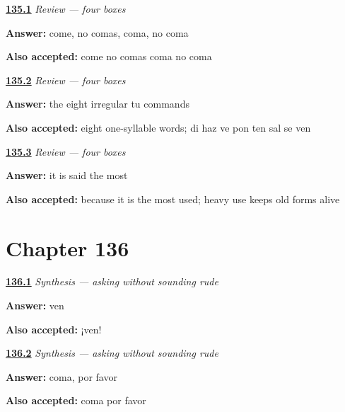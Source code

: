 \noindent\begin{minipage}[t]{\linewidth}
\raggedright
\hyperlink{review-ES-C50-repaso-mandatos-grid}{\textbf{135.1}} \emph{Review — four boxes}\par
\small \textbf{Answer:} come, no comas, coma, no coma\par
\footnotesize \textbf{Also accepted:} come no comas coma no coma
\end{minipage}\par\medskip

\noindent\begin{minipage}[t]{\linewidth}
\raggedright
\hyperlink{review-ES-C50-repaso-mandatos-cost}{\textbf{135.2}} \emph{Review — four boxes}\par
\small \textbf{Answer:} the eight irregular tu commands\par
\footnotesize \textbf{Also accepted:} eight one-syllable words; di haz ve pon ten sal se ven
\end{minipage}\par\medskip

\noindent\begin{minipage}[t]{\linewidth}
\raggedright
\hyperlink{review-ES-C50-repaso-mandatos-odd}{\textbf{135.3}} \emph{Review — four boxes}\par
\small \textbf{Answer:} it is said the most\par
\footnotesize \textbf{Also accepted:} because it is the most used; heavy use keeps old forms alive
\end{minipage}\par\medskip

\section*{Chapter 136}

\noindent\begin{minipage}[t]{\linewidth}
\raggedright
\hyperlink{review-ES-C50-sintesis-pedir-bien-friend}{\textbf{136.1}} \emph{Synthesis — asking without sounding rude}\par
\small \textbf{Answer:} ven\par
\footnotesize \textbf{Also accepted:} ¡ven!
\end{minipage}\par\medskip

\noindent\begin{minipage}[t]{\linewidth}
\raggedright
\hyperlink{review-ES-C50-sintesis-pedir-bien-stranger}{\textbf{136.2}} \emph{Synthesis — asking without sounding rude}\par
\small \textbf{Answer:} coma, por favor\par
\footnotesize \textbf{Also accepted:} coma por favor
\end{minipage}\par\medskip

